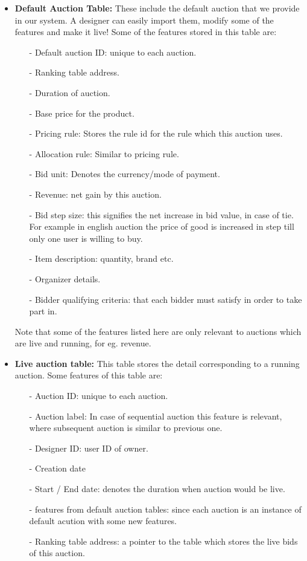 \documentclass[a4paper]{article}
\begin{document}
\begin{itemize}
    \item \textbf{Default Auction Table:} These include the default auction that we provide in our system. A designer can easily import them, modify some of the features and make it live! Some of the features stored in this table are:
    \begin{itemize}
        \item[-] Default auction ID: unique to each auction.
        \item[-] Ranking table address. 
        \item[-] Duration of auction.
        \item[-] Base price for the product.
        \item[-] Pricing rule: Stores the rule id for the rule which this auction uses.
        \item[-] Allocation rule: Similar to pricing rule.
        \item[-] Bid unit: Denotes the currency/mode of payment.
        \item[-] Revenue: net gain by this auction.
        \item[-] Bid step size: this signifies the net increase in bid value, in case of tie. For example in english auction the price of good is increased in step till only one user is willing to buy.
        \item[-] Item description: quantity, brand etc.
        \item[-] Organizer details.
        \item[-] Bidder qualifying criteria: that each bidder must satisfy in order to take part in.
    \end{itemize}
    Note that some of the features listed here are only relevant to auctions which are live and running, for eg. revenue.
    \item \textbf{Live auction table:} This table stores the detail corresponding to a running auction. Some features of this table are:
    \begin{itemize}
        \item[-] Auction ID: unique to each auction.
        \item[-] Auction label: In case of sequential auction this feature is relevant, where subsequent auction is similar to previous one.
        \item[-] Designer ID: user ID of owner.
        \item[-] Creation date
        \item[-] Start / End date: denotes the duration when auction would be live.
        \item[-] features from default auction tables: since each auction is an instance of default acution with some new features.
        \item[-] Ranking table address: a pointer to the table which stores the live bids of this auction.
    \end{itemize}


\end{itemize}
\end{document}

